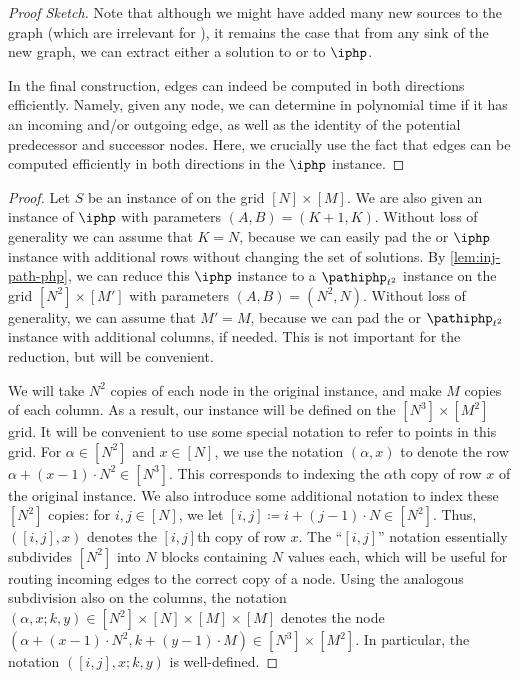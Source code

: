 \begin{proof}[Proof Sketch]
Note that although we might have added many new sources to the graph (which are irrelevant for \sopl), it remains the case that from any sink of the new graph, we can extract either a solution to \sod or to $\iphp$.

In the final construction, edges can indeed be computed in both directions efficiently. Namely, given any node, we can determine in polynomial time if it has an incoming and/or outgoing edge, as well as the identity of the potential predecessor and successor nodes. Here, we crucially use the fact that edges can be computed efficiently in both directions in the $\iphp$ instance.
\end{proof}


\begin{proof}
Let $S$ be an instance of \sod on the grid $[N] \times [M]$. We are also given an instance of $\iphp$ with parameters $(A,B) = (K+1,K)$. Without loss of generality we can assume that $K = N$, because we can easily pad the \sod or $\iphp$ instance with additional rows without changing the set of solutions. By \cref{lem:inj-path-php}, we can reduce this $\iphp$ instance to a $\pathiphp_{t^2}$ instance on the grid $[N^2] \times [M']$ with parameters $(A,B) = (N^2,N)$. Without loss of generality, we can assume that $M' = M$, because we can pad the \sod or $\pathiphp_{t^2}$ instance with additional columns, if needed. This is not important for the reduction, but will be convenient.

We will take $N^2$ copies of each node in the original \sod instance, and make $M$ copies of each column. As a result, our \sopl instance will be defined on the $[N^3] \times [M^2]$ grid. It will be convenient to use some special notation to refer to points in this grid. For $\alpha \in [N^2]$ and $x \in [N]$, we use the notation $(\alpha, x)$ to denote the row $\alpha + (x-1) \cdot N^2 \in [N^3]$. This corresponds to indexing the $\alpha$th copy of row $x$ of the original instance. We also introduce some additional notation to index these $[N^2]$ copies: for $i,j \in [N]$, we let $[i,j] \coloneqq i + (j-1) \cdot N \in [N^2]$. Thus, $([i,j], x)$ denotes the $[i,j]$th copy of row $x$. The ``$[i,j]$'' notation essentially subdivides $[N^2]$ into $N$ blocks containing $N$ values each, which will be useful for routing incoming edges to the correct copy of a node. Using the analogous subdivision also on the columns, the notation $(\alpha,x;k,y) \in [N^2] \times [N] \times [M] \times [M]$ denotes the node $(\alpha + (x-1) \cdot N^2, k + (y-1) \cdot M) \in [N^3] \times [M^2]$. In particular, the notation $([i,j],x;k,y)$ is well-defined.


\end{proof}
